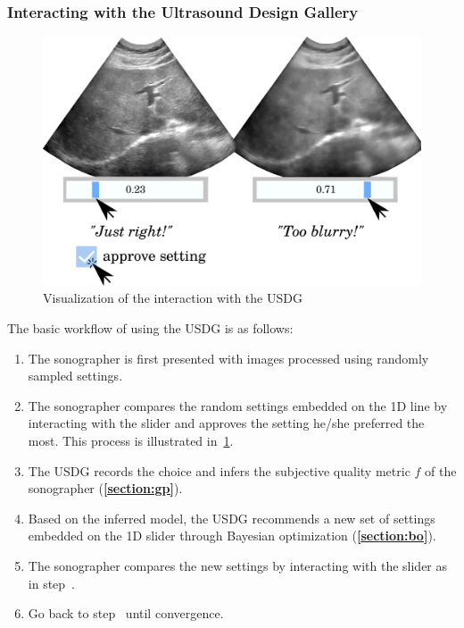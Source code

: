 \subsubsection{Interacting with the Ultrasound Design Gallery}
%
\begin{figure}[t]
  \vspace{-0.2in}
  \centering
  \includegraphics[scale=0.27]{figures/ui_interaction.pdf}
  \caption{Visualization of the interaction with the USDG}\label{fig:interaction}
  \vspace{-0.15in}
\end{figure}
%
The basic workflow of using the USDG is as follows:
\begin{enumerate}
\item[\ding{182}] The sonographer is first presented with images processed using randomly sampled settings.
\item[\ding{183}] The sonographer compares the random settings embedded on the 1D line by interacting with the slider and approves the setting he/she preferred the most. This process is illustrated in~\cref{fig:interaction}.
\item[\ding{184}] The USDG records the choice and infers the subjective quality metric \(f\) of the sonographer (\textbf{\cref{section:gp}}).
\item[\ding{185}] Based on the inferred model, the USDG recommends a new set of settings embedded on the 1D slider through Bayesian optimization (\textbf{\cref{section:bo}}).
\item[\ding{186}] The sonographer compares the new settings by interacting with the slider as in step~.
\item[\ding{187}] Go back to step~ until convergence.
\end{enumerate}

